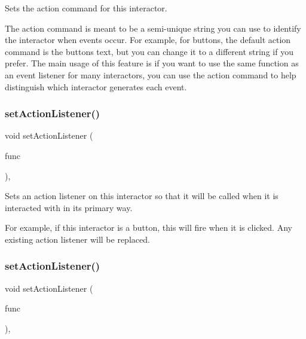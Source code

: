 Sets the action command for this interactor. 

The action command is meant to be a semi-\/unique string you can use to identify the interactor when events occur. For example, for buttons, the default action command is the button\textquotesingle{}s text, but you can change it to a different string if you prefer. The main usage of this feature is if you want to use the same function as an event listener for many interactors, you can use the action command to help distinguish which interactor generates each event. \mbox{\label{classGInteractor_adcfb4742430c88714fcf57e57ab8ea9c}} 
\subsubsection{\texorpdfstring{set\+Action\+Listener()}{setActionListener()}\hspace{0.1cm}{\footnotesize\ttfamily [1/2]}}
{\footnotesize\ttfamily void set\+Action\+Listener (\begin{DoxyParamCaption}\item[{G\+Event\+Listener}]{func }\end{DoxyParamCaption})\hspace{0.3cm}{\ttfamily [virtual]}, {\ttfamily [inherited]}}



Sets an action listener on this interactor so that it will be called when it is interacted with in its primary way. 

For example, if this interactor is a button, this will fire when it is clicked. Any existing action listener will be replaced. \mbox{\label{classGInteractor_aebd20a89c7a8a43a6fce999cf4f9fcf2}} 
\subsubsection{\texorpdfstring{set\+Action\+Listener()}{setActionListener()}\hspace{0.1cm}{\footnotesize\ttfamily [2/2]}}
{\footnotesize\ttfamily void set\+Action\+Listener (\begin{DoxyParamCaption}\item[{G\+Event\+Listener\+Void}]{func }\end{DoxyParamCaption})\hspace{0.3cm}{\ttfamily [virtual]}, {\ttfamily [inherited]}}



